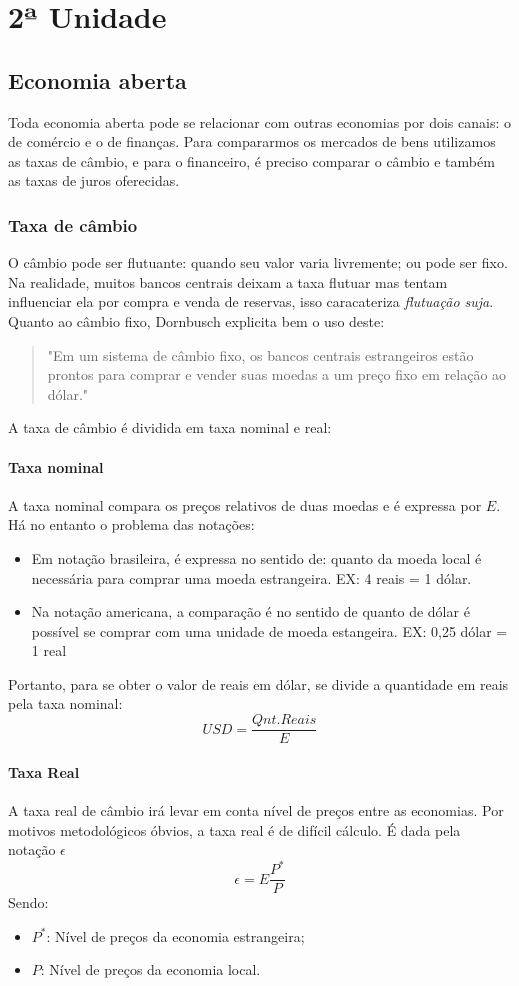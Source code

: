 \documentclass[12pt,a4paper,oneside,brazil]{abntex2}
\begin{document}
\chapter{2ª Unidade}
\section{Economia aberta}
Toda economia aberta pode se relacionar com outras economias por dois canais: o de comércio e o de finanças. Para compararmos os mercados de bens utilizamos as taxas de câmbio, e para o financeiro, é preciso comparar o câmbio e também as taxas de juros oferecidas.

\subsection{Taxa de câmbio}
O câmbio pode ser flutuante: quando seu valor varia livremente; ou pode ser fixo. Na realidade, muitos bancos centrais deixam a taxa flutuar mas tentam influenciar ela por compra e venda de reservas, isso caracateriza \emph{flutuação suja}. Quanto ao câmbio fixo, Dornbusch explicita bem o uso deste: 
\begin{quotation}
"Em um sistema de câmbio fixo, os bancos centrais estrangeiros estão prontos para
comprar e vender suas moedas a um preço fixo em relação ao dólar." \cite[p.274]{rudiger}
\end{quotation}
A taxa de câmbio é dividida em taxa nominal e real:

\subsubsection{Taxa nominal}
A taxa nominal compara os preços relativos de duas moedas e é expressa por $E$. Há no entanto o problema das notações:
\begin{itemize}
\item  Em notação brasileira, é expressa no sentido de: quanto da moeda local é necessária para comprar uma moeda estrangeira. EX: 4 reais = 1 dólar.
\item Na notação americana, a comparação é no sentido de quanto de dólar é possível se comprar com uma unidade de moeda estangeira. EX: 0,25 dólar = 1 real
\end{itemize}
Portanto, para se obter o valor de reais em dólar, se divide a quantidade em reais pela taxa nominal:
\[ USD = \frac{Qnt. Reais}{E}\]

\subsubsection{Taxa Real}
A taxa real de câmbio irá levar em conta  nível de preços entre as economias. Por motivos metodológicos óbvios, a taxa real é de difícil cálculo. É dada pela notação $\epsilon$
\[ \epsilon = E \frac{P^*}{P}\]
Sendo:
\begin{itemize}
\item $P^*$: Nível de preços da economia estrangeira;
\item $P$: Nível de preços da economia local.
\end{itemize}
\end{document}
